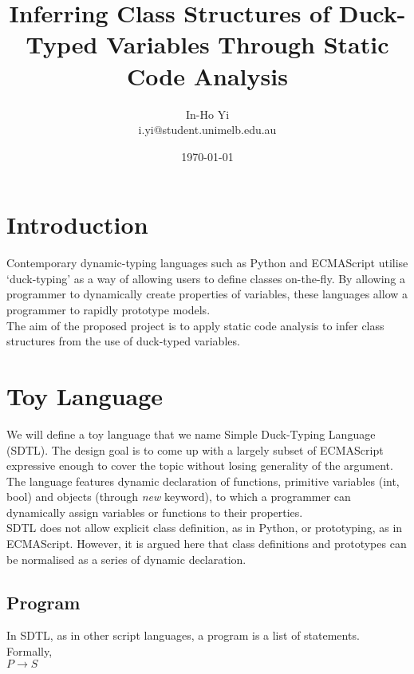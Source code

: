 \documentclass[a4paper,12pt]{article}
\begin{document}
\title{Inferring Class Structures of Duck-Typed Variables Through Static Code Analysis}
\author{In-Ho Yi\\
i.yi@student.unimelb.edu.au
}
\date{\today}
\maketitle
\section{Introduction}
Contemporary dynamic-typing languages such as Python and ECMAScript utilise `duck-typing' as a way of allowing users to define classes on-the-fly. By allowing a programmer to dynamically create properties of variables, these languages allow a programmer to rapidly prototype models.\\
The aim of the proposed project is to apply static code analysis to infer class structures from the use of duck-typed variables. 
\section{Toy Language}
We will define a toy language that we name Simple Duck-Typing Language (SDTL). The design goal is to come up with a largely subset of ECMAScript expressive enough to cover the topic without losing generality of the argument. The language features dynamic declaration of functions, primitive variables (int, bool) and objects (through \textit{new} keyword), to which a programmer can dynamically assign variables or functions to their properties.\\
SDTL does not allow explicit class definition, as in Python, or prototyping, as in ECMAScript. However, it is argued here that class definitions and prototypes can be normalised as a series of dynamic declaration.\\

\subsection{Program}
In SDTL, as in other script languages, a program is a list of statements. Formally,\\
$P \rightarrow S$\\
\end{document}
